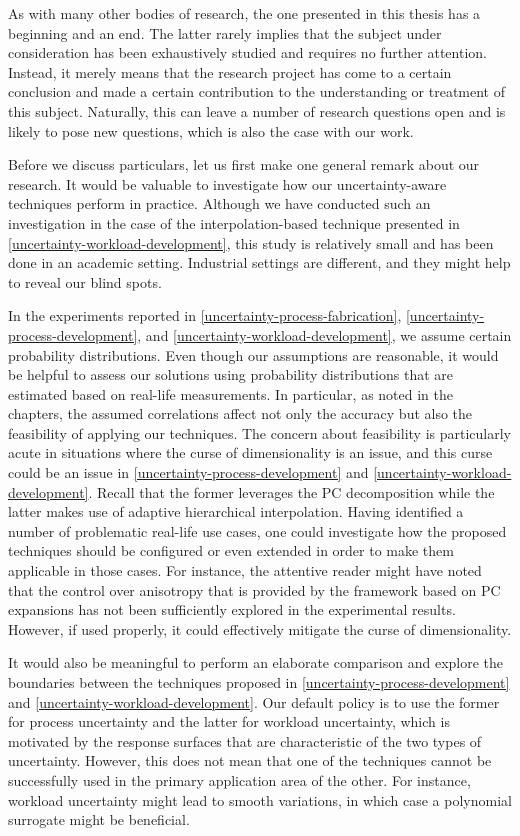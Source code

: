 As with many other bodies of research, the one presented in this thesis has a
beginning and an end. The latter rarely implies that the subject under
consideration has been exhaustively studied and requires no further attention.
Instead, it merely means that the research project has come to a certain
conclusion and made a certain contribution to the understanding or treatment of
this subject. Naturally, this can leave a number of research questions open and
is likely to pose new questions, which is also the case with our work.

Before we discuss particulars, let us first make one general remark about our
research. It would be valuable to investigate how our uncertainty-aware
techniques perform in practice. Although we have conducted such an investigation
in the case of the interpolation-based technique presented in
\cref{uncertainty-workload-development}, this study is relatively small and has
been done in an academic setting. Industrial settings are different, and they
might help to reveal our blind spots.

In the experiments reported in \cref{uncertainty-process-fabrication},
\cref{uncertainty-process-development}, and
\cref{uncertainty-workload-development}, we assume certain probability
distributions. Even though our assumptions are reasonable, it would be helpful
to assess our solutions using probability distributions that are estimated based
on real-life measurements. In particular, as noted in the chapters, the assumed
correlations affect not only the accuracy but also the feasibility of applying
our techniques. The concern about feasibility is particularly acute in
situations where the curse of dimensionality is an issue, and this curse could
be an issue in \cref{uncertainty-process-development} and
\cref{uncertainty-workload-development}. Recall that the former leverages the
\ac{PC} decomposition while the latter makes use of adaptive hierarchical
interpolation. Having identified a number of problematic real-life use cases,
one could investigate how the proposed techniques should be configured or even
extended in order to make them applicable in those cases. For instance, the
attentive reader might have noted that the control over anisotropy that is
provided by the framework based on \ac{PC} expansions has not been sufficiently
explored in the experimental results. However, if used properly, it could
effectively mitigate the curse of dimensionality.

It would also be meaningful to perform an elaborate comparison and explore the
boundaries between the techniques proposed in
\cref{uncertainty-process-development} and
\cref{uncertainty-workload-development}. Our default policy is to use the former
for process uncertainty and the latter for workload uncertainty, which is
motivated by the response surfaces that are characteristic of the two types of
uncertainty. However, this does not mean that one of the techniques cannot be
successfully used in the primary application area of the other. For instance,
workload uncertainty might lead to smooth variations, in which case a polynomial
surrogate might be beneficial.

